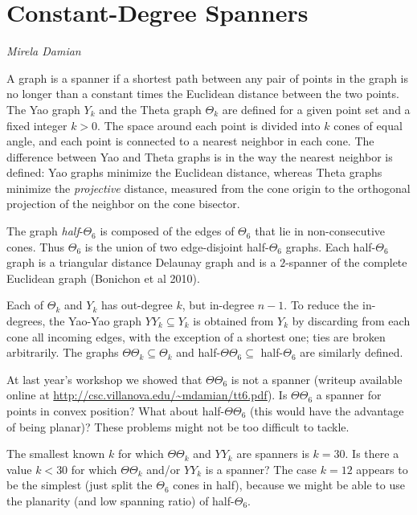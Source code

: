 \documentclass{patmorin}
\begin{document}
\section{Constant-Degree Spanners}

\noindent\emph{Mirela Damian}

A graph is a spanner if a shortest path between any pair of points in the
graph is no longer than a constant times the Euclidean distance between
the two points.  The Yao graph $Y_k$ and the Theta graph $\Theta_k$
are defined for a given point set and a fixed integer $k > 0$. The space
around each point is divided into $k$ cones of equal angle, and each point
is connected to a nearest neighbor in each cone. The difference between
Yao and Theta graphs is in the way the nearest neighbor is defined: Yao
graphs minimize the Euclidean distance, whereas Theta graphs minimize
the \emph{projective} distance, measured from the cone origin to the
orthogonal projection of the neighbor on the cone bisector.

The graph \emph{half}-$\Theta_6$ is composed of the edges of $\Theta_6$
that lie in non-consecutive cones. Thus $\Theta_6$ is the union of two
edge-disjoint half-$\Theta_6$ graphs.  Each half-$\Theta_6$ graph is a
triangular distance Delaunay graph and is a $2$-spanner of the complete
Euclidean graph (Bonichon et al 2010).

Each of $\Theta_k$ and $Y_k$ has out-degree $k$, but in-degree $n-1$. To
reduce the in-degrees, the Yao-Yao graph $YY_k \subseteq Y_k$ is obtained
from $Y_k$ by discarding from each cone all incoming edges, with the
exception of a shortest one; ties are broken arbitrarily. The graphs
$\Theta\Theta_k \subseteq \Theta_k$ and half-$\Theta\Theta_6 \subseteq$
half-$\Theta_6$ are similarly defined.

\begin{op}
At last year's workshop we showed that $\Theta\Theta_6$ is not a spanner (writeup available online at \url{http://csc.villanova.edu/~mdamian/tt6.pdf}). Is $\Theta\Theta_6$ a spanner for points in convex position? What about half-$\Theta\Theta_6$ (this would have the advantage of being planar)? These problems might not be too difficult to tackle. 
\end{op}

\begin{op}
The smallest known $k$ for which $\Theta\Theta_k$ and $YY_k$ are spanners is $k = 30$. Is there a value $k < 30$ for which $\Theta\Theta_k$ and/or $YY_k$ is a spanner? The case $k = 12$ appears to be the simplest (just split the $\Theta_6$ cones in half), because we might be able to use the planarity (and low spanning ratio) of half-$\Theta_6$.
\end{op}


%
\end{document}
